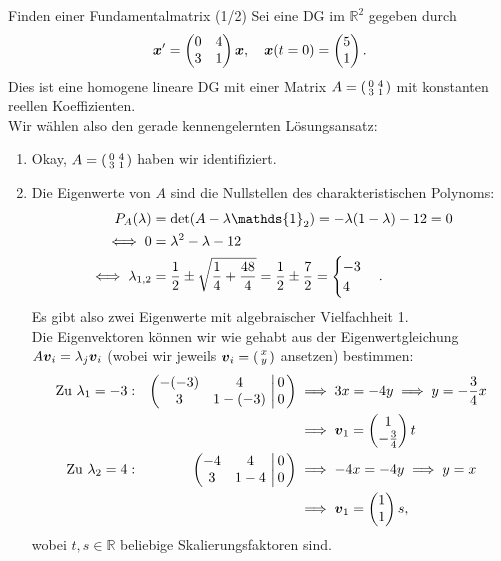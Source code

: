 \begin{Beispiel}
{Finden einer Fundamentalmatrix (1/2)}
Sei eine DG im $\mathbb{R}^2$ gegeben durch
\begin{equation*}
    {{\text{\boldmath${x}$}}}'=\begin{pmatrix}0&4\\3&1\end{pmatrix}{{\text{\boldmath${x}$}}},\quad {{\text{\boldmath${x}$}}}(t=0)=\begin{pmatrix}5\\1\end{pmatrix}.
\end{equation*}
Dies ist eine homogene lineare DG mit einer Matrix $A=\left(\begin{smallmatrix}0&4\\3&1\end{smallmatrix}\right)$ mit konstanten reellen Koeffizienten.\\
Wir wählen also den gerade kennengelernten Lösungsansatz:
\begin{enumerate}
    \item Okay, $A=\left(\begin{smallmatrix}0&4\\3&1\end{smallmatrix}\right)$ haben wir identifiziert.
    \item Die Eigenwerte von $A$ sind die Nullstellen des charakteristischen Polynoms:
    \begin{align*}
        P_A(\lambda)&=\det(A-\lambda\mathds{1}_2)=-\lambda(1-\lambda)-12=0\\
        \iff 0&=\lambda^2-\lambda-12\\
    \iff \lambda_{1,2}&=\frac{1}{2}\pm\sqrt{\frac{1}{4}+\frac{48}{4}}=\frac{1}{2}\pm \frac{7}{2}=\Cases{-3\\4}.
    \end{align*}
    Es gibt also zwei Eigenwerte mit algebraischer Vielfachheit 1.\\
    Die Eigenvektoren können wir wie gehabt aus der Eigenwertgleichung $A{{\text{\boldmath${v}$}}}_i=\lambda_j{{\text{\boldmath${v}$}}}_i$ (wobei wir jeweils ${{\text{\boldmath${v}$}}}_i=\left(\begin{smallmatrix}x\\y\end{smallmatrix}\right)$ ansetzen) bestimmen:
    \begin{alignat*}{3}
    \text{Zu }\lambda_1=-3:&&\left(\begin{matrix}-(-3)&4\\3&1-(-3)\end{matrix}\,\left|\,\begin{matrix}0\\0\end{matrix}\right.\right)&\implies 3x=-4y\implies y=-\frac{3}{4}x\\
    &&&\implies {{\text{\boldmath${v}$}}}_1=\begin{pmatrix}1\\-\frac{3}{4}\end{pmatrix}t\\
    \text{Zu }\lambda_2=4:&&\left(\begin{matrix}-4&4\\3&1-4\end{matrix}\,\left|\,\begin{matrix}0\\0\end{matrix}\right.\right)&\implies -4x=-4y\implies y=x\\
    &&&\implies {{\text{\boldmath${v}$}}}_1=\begin{pmatrix}1\\1\end{pmatrix}s,
    \end{alignat*}
    wobei $t,s\in\mathbb{R}$ beliebige Skalierungsfaktoren sind.

\end{enumerate}
\end{Beispiel}
